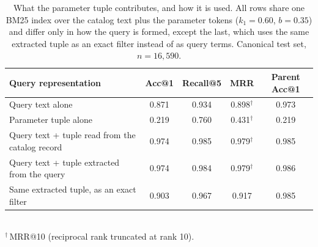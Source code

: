 \begin{table}[ht]
\centering
\caption{What the parameter tuple contributes, and how it is used. All rows share one BM25 index over the catalog text plus the parameter tokens ($k_1{=}0.60$, $b{=}0.35$) and differ only in how the query is formed, except the last, which uses the same extracted tuple as an exact filter instead of as query terms. Canonical test set, $n=16{,}590$.}
\label{tab:param_tokens}
\begin{tabular}{lcccc}
\toprule
\textbf{Query representation} & \textbf{Acc@1} & \textbf{Recall@5} & \textbf{MRR} & \textbf{Parent Acc@1} \\
\midrule
Query text alone & 0.871 & 0.934 & 0.898$^{\dagger}$ & 0.973 \\
Parameter tuple alone & 0.219 & 0.760 & 0.431$^{\dagger}$ & 0.219 \\
Query text + tuple read from the catalog record & 0.974 & 0.985 & 0.979$^{\dagger}$ & 0.985 \\
Query text + tuple extracted from the query & 0.974 & 0.984 & 0.979$^{\dagger}$ & 0.986 \\
\midrule
Same extracted tuple, as an exact filter & 0.903 & 0.967 & 0.917 & 0.985 \\
\bottomrule
\end{tabular}
\\[2pt]{\footnotesize $^{\dagger}$\,MRR@10 (reciprocal rank truncated at rank 10).}
\end{table}
